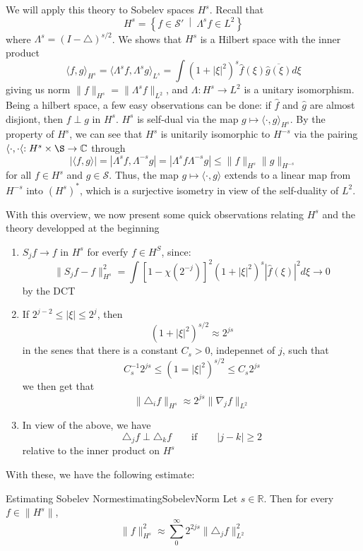 \documentclass{book}
\newcommand{\R}{{\mathbb{R}}}
\newcommand{\C}{{\mathbb{C}}}
\newcommand{\CS}{{\mathcal{S}}}
\newcommand{\oln}[1]{{\overline{#1}}}
\newcommand{\rw}{\rightarrow}
\newcommand{\set}[2]{\left\{#1 \ \middle|\ #2\right\}}
\begin{document}
We will apply this theory to Sobelev spaces $H^s$. Recall that
\[
	H^s  =\set{f \in \CS'}{\Lambda^s f \in L^2}
\]
where $\Lambda^s = (I - \triangle)^{s/2}$. We shows that $H^s$ is a Hilbert space with the inner product
\[
	\langle f,g\rangle_{H^s} = \langle \Lambda^s f, \Lambda^s g\rangle_{L^s} = \int (1+ |\xi|^2)^s \hat{f}(\xi)
	\oln{\hat{g}(\xi)}d\xi
\]
giving us norm $\|f\|_{H^s} = \|\Lambda^s f\|_{L^2}$, and $\Lambda: H^s \rw L^2$ is a unitary isomorphism. Being
a hilbert space, a few easy observations can be done: if $\hat{f}$ and $\hat{g}$ are almost disjiont, then
$f\perp g$ in $H^s$. $H^s$ is self-dual via the map $g \mapsto \langle \cdot, g\rangle_{H^s}$. By the property of $H^s$,
we can see that $H^s$ is unitarily isomorphic to $H^{-s}$ via the pairing $\langle \cdot, \cdot\langle: H^s \times
\S \rw \C$ through
\[
	|\langle f,g\rangle| = |\Lambda^s f, \Lambda^{-s}g| = \left| \Lambda^s f\Lambda^{-s}g\right| \le
	\|f\|_{H^s}\|g\|_{H^{-s}}
\]
for all $f \in H^s$ and $g \in \CS$. Thus, the map $g \mapsto \langle \cdot, g\rangle$ extends to a linear map from
$H^{-s}$ into $(H^s)^*$, which is a surjective isometry in view of the self-duality of $L^2$.


With this overview, we now present some quick observations relating $H^s$ and the theory developped at the beginning
\begin{enumerate}
	\item $S_jf \rw f$ in $H^s$ for everfy $f \in H^S$, since:
		\[
			\| S_j f - f\|_{H^s}^2 = \int [1-\chi(2^{-j})]^2(1 + |\xi|^2)^s|\hat{f}(\xi)|^2d\xi
			\rw 0
		\]
		by the DCT
	\item If $2^{j-2} \le |\xi| \le 2^j$, then
		\[
			(1 + |\xi|^2)^{s/2} \approx 2^{js}
		\]
		in the senes that there is a constant $C_s > 0$, indepennet of $j$, such that
		\[
			C_s^{-1}2^{js} \le (1 = |\xi|^2)^{s/2} \le C_s2^{js}
		\]
		we then get that
		\[
			\|\triangle_i f\|_{H^s} \approx 2^{js}\|\nabla_j f\|_{L^2}
		\]
	\item In view of the above, we have
		\[
			\triangle_j f\perp \triangle_k f \qquad \text{if} \qquad |j-k| \ge 2
		\]
		relative to the inner product on $H^s$
\end{enumerate}


With these, we have the following estimate:

\begin{prop}{Estimating Sobelev Norm}{estimatingSobelevNorm}
	Let $s \in \R$. Then for every $f \in \|H^s\|$,
	\[
		\|f\|_{H^s}^2 \approx \sum_0^\infty 2^{2js} \|\triangle_j f\|_{L^2}^2
	\]
\end{prop}
\end{document}
